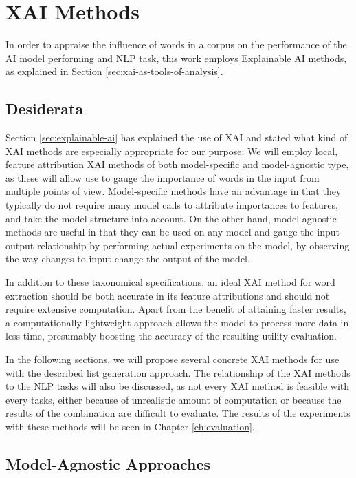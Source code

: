 \section{XAI Methods} \label{sec:xai-methods}
In order to appraise the influence of words in a corpus on the performance of the AI model performing and NLP task, this work employs Explainable AI methods, as explained in Section \ref{sec:xai-as-tools-of-analysis}.

\subsection{Desiderata}
Section \ref{sec:explainable-ai} has explained the use of XAI and stated what kind of XAI methods are especially appropriate for our purpose:
We will employ local, feature attribution XAI methods of both model-specific and model-agnostic type, as these will allow use to gauge the importance of words in the input from multiple points of view.
Model-specific methods have an advantage in that they typically do not require many model calls to attribute importances to features, and take the model structure into account.
On the other hand, model-agnostic methods are useful in that they can be used on any model and gauge the input-output relationship by performing actual experiments on the model, by observing the way changes to input change the output of the model.

In addition to these taxonomical specifications, an ideal XAI method for word extraction should be both accurate in its feature attributions and should not require extensive computation.
Apart from the benefit of attaining faster results, a computationally lightweight approach allows the model to process more data in less time, presumably boosting the accuracy of the resulting utility evaluation.

In the following sections, we will propose several concrete XAI methods for use with the described list generation approach.
The relationship of the XAI methods to the NLP tasks will also be discussed, as not every XAI method is feasible with every tasks, either because of unrealistic amount of computation or because the results of the combination are difficult to evaluate.
The results of the experiments with these methods will be seen in Chapter \ref{ch:evaluation}.

\subsection{Model-Agnostic Approaches}

